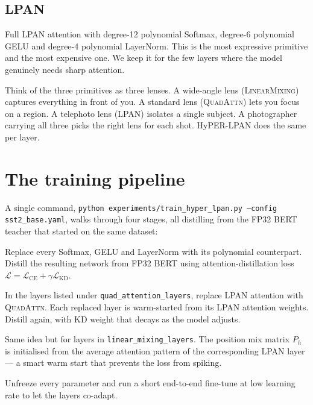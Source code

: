 \documentclass[11pt,a4paper]{article}
\newcommand{\LM}{\textsc{LinearMixing}}
\newcommand{\Quad}{\textsc{QuadAttn}}
\newcommand{\LPAN}{\textsc{LPAN}}
\newcommand{\hyperlpan}{HyPER-LPAN}
\begin{document}
\subsection{LPAN}
Full LPAN attention with degree-12 polynomial Softmax,
degree-6 polynomial GELU and degree-4 polynomial LayerNorm.
This is the most expressive primitive and the most expensive one. We
keep it for the few layers where the model genuinely needs sharp
attention.

\begin{intuition}
Think of the three primitives as three lenses. A wide-angle lens
(\LM{}) captures everything in front of you. A standard lens
(\Quad{}) lets you focus on a region. A telephoto lens (\LPAN{})
isolates a single subject. A photographer carrying all three picks
the right lens for each shot. \hyperlpan{} does the same per layer.
\end{intuition}

\section{The training pipeline}

A single command,
\texttt{python experiments/train\_hyper\_lpan.py --config sst2\_base.yaml},
walks through four stages, all distilling from the FP32 BERT teacher
that started on the same dataset:

\begin{description}[leftmargin=1.2cm,style=nextline]
\item[Stage A — LPAN baseline.] Replace every Softmax, GELU and
  LayerNorm with its polynomial counterpart. Distill the resulting
  network from FP32 BERT using attention-distillation loss
  $\mathcal{L} = \mathcal{L}_{\text{CE}} + \gamma \mathcal{L}_{\text{KD}}$.

\item[Stage B — Mid-layer Quad replacement.] In the layers listed under
  \texttt{quad\_attention\_layers}, replace LPAN attention with
  \Quad{}. Each replaced layer is warm-started from its LPAN
  attention weights. Distill again, with KD weight that decays as
  the model adjusts.

\item[Stage C — Early-layer LinearMixing replacement.] Same idea but
  for layers in \texttt{linear\_mixing\_layers}. The position mix
  matrix $P_h$ is initialised from the average attention pattern of
  the corresponding LPAN layer — a smart warm start that prevents
  the loss from spiking.

\item[Stage D — Global fine-tune.] Unfreeze every parameter and run a
  short end-to-end fine-tune at low learning rate to let the layers
  co-adapt.
\end{description}
\end{document}
